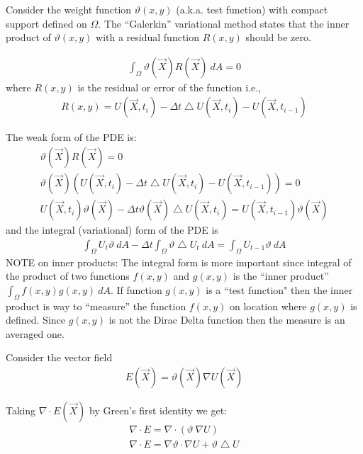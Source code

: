 \documentclass{birkjour}
\numberwithin{equation}{section}
\begin{document}
Consider the weight function $\vartheta (x,y)$ (a.k.a. test function) with compact support defined on $\Omega$.
The ``Galerkin'' variational method states that the inner product of $\vartheta(x,y)$ with a residual function $R(x,y)$ should be zero.

\begin{eqnarray}
	\int_{\Omega} { \vartheta(\vec X) R(\vec X) \ dA } = 0 \nonumber
\end{eqnarray}
 where $R(x,y)$ is the residual or error of the function i.e., 
\begin{eqnarray}
	R(x,y) = U(\vec X, t_i) - \Delta t \bigtriangleup U(\vec X, t_i) - U(\vec X, t_{i-1}) \nonumber
\end{eqnarray}

The weak form of the PDE is:
\begin{eqnarray}
	\vartheta(\vec X) R(\vec X) = 0 \nonumber\\
	\vartheta(\vec X) (U(\vec X, t_i) - \Delta t \bigtriangleup U(\vec X, t_i) - U(\vec X, t_{i-1})) = 0 \nonumber\\
	U(\vec X, t_i) \vartheta(\vec X) - \Delta t \vartheta(\vec X) \bigtriangleup U(\vec X, t_i) = U(\vec X, t_{i-1}) \vartheta(\vec X) \nonumber
\end{eqnarray}
 and the integral (variational) form of the PDE is
\begin{eqnarray}
	\label{eqn:original_weak_form}
	\int_{\Omega}{ U_t \vartheta \ dA } - \Delta t \int_{\Omega}{ \vartheta \bigtriangleup U_t \ dA} = \int_{\Omega} { U_{t-1} \vartheta \ dA }
\end{eqnarray}
NOTE on inner products: The integral form is more important since integral of the product 
of two functions $f(x,y)$ and $g(x,y)$ is the ``inner product'' $\int_{\Omega}{ f(x,y) g(x,y) \ dA }$.
If function $g(x,y)$ is a ``test function" then the inner product is way to ``measure'' the 
function $f(x,y)$ on location where $g(x,y)$ is defined. Since $g(x,y)$ is not the Dirac Delta 
function then the measure is an averaged one.
 
Consider the vector field
\begin{eqnarray}
	E(\vec X) = \vartheta(\vec X) \nabla U(\vec X)
\end{eqnarray}
 
Taking $\nabla \cdot E(\vec X)$ by Green's first identity we get:
\begin{eqnarray}
	\label{eqn:green_first_identity}
	\nabla \cdot E = \nabla \cdot (\vartheta \ \nabla U) \nonumber\\
	\nabla \cdot E = \nabla \vartheta \cdot \nabla U + \vartheta \bigtriangleup U
\end{eqnarray} 
\end{document}
